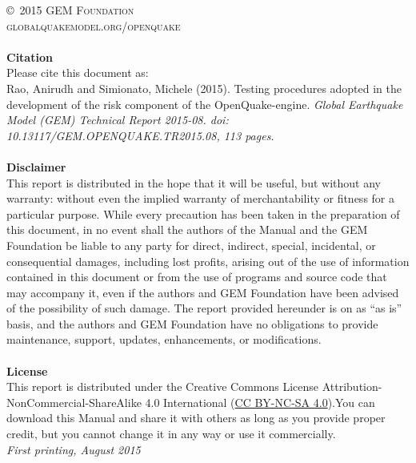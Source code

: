 \documentclass[11pt,fleqn]{book} %
\begin{document}
\noindent \copyright\ \textsc{2015 GEM Foundation}\\ %
\noindent \textsc{globalquakemodel.org/openquake}\\ %
\noindent \hfill\\
\noindent
   {\textbf{Citation}} \hfill \\
   Please cite this document as: \hfill \\
   Rao, Anirudh and Simionato, Michele (2015). Testing procedures adopted in the development of the risk component of the OpenQuake-engine. 
   \textit{Global Earthquake Model (GEM) Technical Report 2015-08. 
   doi: 10.13117/GEM.OPENQUAKE.TR2015.08, 113 pages.} \hfill \\
\noindent \hfill\\
\noindent
   {\bf{Disclaimer}} \hfill \\
   This report is distributed in the hope that it will be useful, but without any warranty: without even the implied warranty of merchantability or fitness for a particular purpose. While every precaution has been taken in the preparation of this document, in no event shall the authors of the Manual and the GEM Foundation be liable to any party for direct, indirect, special, incidental, or consequential damages, including lost profits, arising out of the use of information contained in this document or from the use of programs and source code that may accompany it, even if the authors and GEM Foundation have been advised of the possibility of such damage. The report provided hereunder is on as ``as is'' basis, and the authors and GEM Foundation have no obligations to provide maintenance, support, updates, enhancements, or modifications. \hfill \\

\noindent \hfill\\
\noindent
   {\bf{License}} \hfill \\
   This report is distributed under the Creative Commons License Attribution-NonCommercial-ShareAlike 4.0 International (\href{http://creativecommons.org/licenses/by-nc-sa/4.0/}
   {CC BY-NC-SA 4.0}).You can download this Manual and share it with others as long as you provide proper credit, but you cannot change it in any way or use it commercially.\hfill \\

\noindent \textit{First printing, August 2015} %

\end{document}
